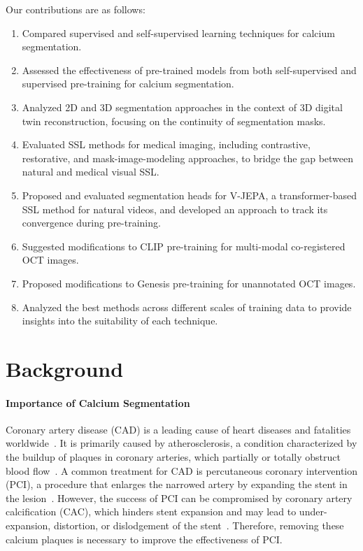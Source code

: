 \documentclass[a4paper,11pt,oneside]{report}
\begin{document}
Our contributions are as follows:
\begin{enumerate}
    \item Compared supervised and self-supervised learning techniques for calcium segmentation.
    \item Assessed the effectiveness of pre-trained models from both self-supervised and supervised pre-training for calcium segmentation. 
    \item Analyzed 2D and 3D segmentation approaches in the context of 3D digital twin reconstruction, focusing on the continuity of segmentation masks.
    \item Evaluated SSL methods for medical imaging, including contrastive, restorative, and mask-image-modeling approaches, to bridge the gap between natural and medical visual SSL.
    \item Proposed and evaluated segmentation heads for V-JEPA, a transformer-based SSL method for natural videos, and developed an approach to track its convergence during pre-training.
    \item Suggested modifications to CLIP pre-training for multi-modal co-registered OCT images.
    \item Proposed modifications to Genesis pre-training for unannotated OCT images. 
    \item Analyzed the best methods across different scales of training data to provide insights into the suitability of each technique.
\end{enumerate}

\chapter{Background}


\subsubsection{Importance of Calcium Segmentation}
Coronary artery disease (CAD) is a leading cause of heart diseases and fatalities worldwide~\cite{Ralapanawa2021, Virani2021Heart, Wu2015}. It is primarily caused by atherosclerosis, a condition characterized by the buildup of plaques in coronary arteries, which partially or totally obstruct blood flow~\cite{Shahjehan2023}. A common treatment for CAD is percutaneous coronary intervention (PCI), a procedure that enlarges the narrowed artery by expanding the stent in the lesion~\cite{Ahmad2023}. However, the success of PCI can be compromised by coronary artery calcification (CAC), which hinders stent expansion and may lead to under-expansion, distortion, or dislodgement of the stent~\cite{Hennessey2023}. Therefore, removing these calcium plaques is necessary to improve the effectiveness of PCI. 
\end{document}
